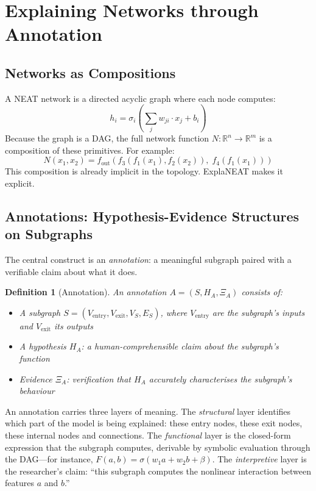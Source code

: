 \documentclass[11pt]{article}
\newtheorem{definition}{Definition}
\begin{document}
\section{Explaining Networks through Annotation}
\label{sec:framework}

\subsection{Networks as Compositions}

A NEAT network is a directed acyclic graph where each node computes:
\begin{equation}
\label{eq:node}
h_i = \sigma_i\!\left(\sum_j w_{ji} \cdot x_j + b_i\right)
\end{equation}
Because the graph is a DAG, the full network function $N: \mathbb{R}^n \to \mathbb{R}^m$ is a composition of these primitives. For example:
\begin{equation}
N(x_1, x_2) = f_{\text{out}}(f_3(f_1(x_1), f_2(x_2)),\; f_4(f_1(x_1)))
\end{equation}
This composition is already implicit in the topology. ExplaNEAT makes it explicit.

\subsection{Annotations: Hypothesis-Evidence Structures on Subgraphs}

The central construct is an \emph{annotation}: a meaningful subgraph paired with a verifiable claim about what it does.

\begin{definition}[Annotation]
\label{def:annotation}
An annotation $A = (S, H_A, \Xi_A)$ consists of:
\begin{itemize}
    \item A subgraph $S = (V_{\text{entry}}, V_{\text{exit}}, V_S, E_S)$, where $V_{\text{entry}}$ are the subgraph's inputs and $V_{\text{exit}}$ its outputs
    \item A hypothesis $H_A$: a human-comprehensible claim about the subgraph's function
    \item Evidence $\Xi_A$: verification that $H_A$ accurately characterises the subgraph's behaviour
\end{itemize}
\end{definition}

An annotation carries three layers of meaning. The \emph{structural} layer identifies which part of the model is being explained: these entry nodes, these exit nodes, these internal nodes and connections. The \emph{functional} layer is the closed-form expression that the subgraph computes, derivable by symbolic evaluation through the DAG---for instance, $F(a,b) = \sigma(w_1 a + w_2 b + \beta)$. The \emph{interpretive} layer is the researcher's claim: ``this subgraph computes the nonlinear interaction between features $a$ and $b$.''
\end{document}
